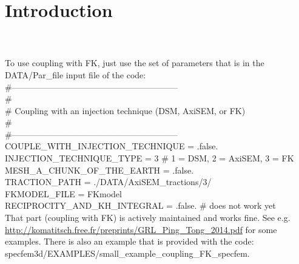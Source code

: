 \chapter{Introduction}

\\

 \\
To use coupling with FK, just use the set of parameters that is in the DATA/Par\_file input file of the code: \\
\#----------------------------------------------------------- \\
\# \\
\# Coupling with an injection technique (DSM, AxiSEM, or FK) \\
\# \\
\#----------------------------------------------------------- \\
COUPLE\_WITH\_INJECTION\_TECHNIQUE = .false. \\
INJECTION\_TECHNIQUE\_TYPE        = 3   \# 1 = DSM, 2 = AxiSEM, 3 = FK \\
MESH\_A\_CHUNK\_OF\_THE\_EARTH       = .false. \\
TRACTION\_PATH                   = ./DATA/AxiSEM\_tractions/3/ \\
FKMODEL\_FILE                    = FKmodel \\
RECIPROCITY\_AND\_KH\_INTEGRAL     = .false.   \# does not work yet \\
That part (coupling with FK) is actively maintained and works fine. See e.g. \url{http://komatitsch.free.fr/preprints/GRL_Ping_Tong_2014.pdf} for some examples.
There is also an example that is provided with the code: specfem3d/EXAMPLES/small\_example\_coupling\_FK\_specfem. \\
